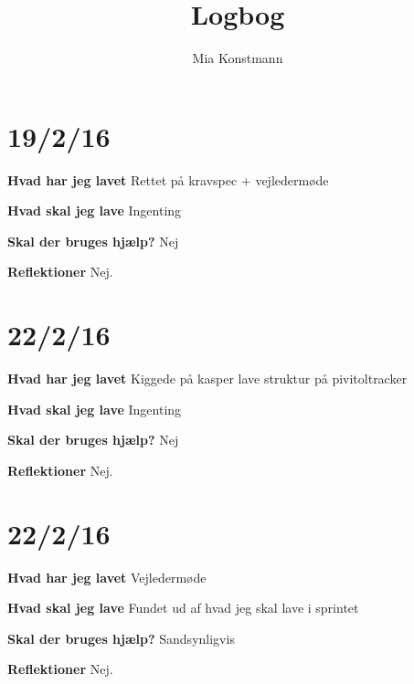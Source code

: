 \documentclass{article}
\title{Logbog}
\author{Mia Konstmann}
\date{}
\begin{document}
	\maketitle
	\tableofcontents
	
	\section{19/2/16}
	\textbf{Hvad har jeg lavet}
	Rettet på kravspec + vejledermøde
	
	\textbf{Hvad skal jeg lave}
	Ingenting
	
	\textbf{Skal der bruges hjælp?}
	Nej
	
	\textbf{Reflektioner}
	Nej.
	
	\section{22/2/16}
	\textbf{Hvad har jeg lavet}
	Kiggede på kasper lave struktur på pivitoltracker
	
	\textbf{Hvad skal jeg lave}
	Ingenting
	
	\textbf{Skal der bruges hjælp?}
	Nej
	
	\textbf{Reflektioner}
	Nej.
	
	\section{22/2/16}
	\textbf{Hvad har jeg lavet}
	Vejledermøde
	
	\textbf{Hvad skal jeg lave}
	Fundet ud af hvad jeg skal lave i sprintet
	
	\textbf{Skal der bruges hjælp?}
	Sandsynligvis
	
	\textbf{Reflektioner}
	Nej.	
\end{document}
